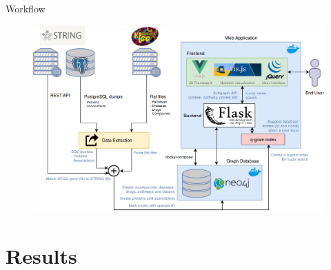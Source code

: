 \documentclass{beamer}
\begin{document}
\begin{frame}{Workflow}



\begin{figure}
    \centering
    \includegraphics[width=\linewidth]{workflow.png}
\end{figure}
\end{frame}

\section{Results}

\end{document}
